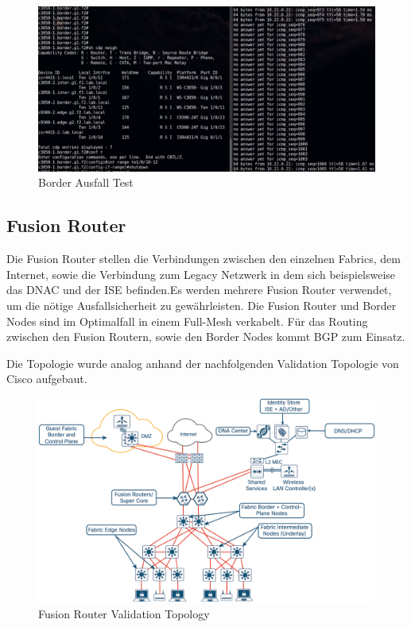 \begin{figure}[H]
	\centering
	\includegraphics[width=1\linewidth]{img/Absicherung/border-ausfall-test}
	\caption{Border Ausfall Test}
	\label{fig:Border Ausfall Test}
\end{figure}




\subsection{Fusion Router}
Die Fusion Router stellen die Verbindungen zwischen den einzelnen Fabrics, dem Internet, sowie die Verbindung zum Legacy Netzwerk in dem sich beispielsweise das DNAC und der ISE befinden.Es werden mehrere Fusion Router verwendet, um die nötige Ausfallsicherheit zu gewährleisten. Die Fusion Router und Border Nodes sind im Optimalfall in einem Full-Mesh verkabelt. Für das Routing zwischen den Fusion Routern, sowie den Border Nodes kommt BGP zum Einsatz.

Die Topologie wurde analog anhand der nachfolgenden Validation Topologie von Cisco aufgebaut.
\begin{figure}[H]
	\centering
	\includegraphics[width=1\linewidth]{img/Absicherung/FusionRouter-ValidationTopology}
	\caption{Fusion Router Validation Topology \cite{sda-deploymentguide-oct2018} }
	\label{fig:Fusion Router Validation Topology}
\end{figure}

